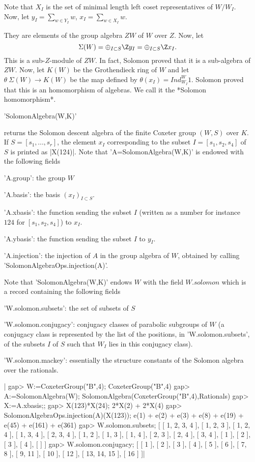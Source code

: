 Note  that $X_I$ is the set of minimal length left coset representatives of
$W/W_I$. Now, let $y_I=\sum_{w \in Y_I} w$, $x_I=\sum_{w \in X_I} w$.

They  are elements  of the  group algebra  $ZW$ of  $W$ over  $Z$. Now, let
$$\Sigma(W)  =  \oplus_{I  \subset  S}  \Z  y_I = \oplus_{I \subset S} \Z
x_I.$$ This is a sub-$Z$-module of $ZW$. In fact, Solomon proved that it is
a  sub-algebra of $ZW$. Now, let $K(W)$ be the Grothendieck ring of $W$ and
let  $\theta\:\Sigma(W)\to  K(W)$  be  the  map  defined  by $\theta(x_I) =
Ind_{W_I}^W 1$. Solomon proved that this is an homomorphism of algebras. We
call it the *Solomon homomorphism*.

'SolomonAlgebra(W,K)'

returns  the Solomon  descent algebra  of the  finite Coxeter group $(W,S)$
over  $K$.  If  $S=[s_1,...,s_r]$,  the  element $x_I$ corresponding to the
subset   $I=[s_1,s_2,s_4]$  of  $S$  is  printed  as  |X(124)|.  Note  that
'A\:=SolomonAlgebra(W,K)' is endowed with the following fields\:

'A.group': the group $W$

'A.basis': the basis $(x_I)_{I \subset S}$.

'A.xbasis':  the function sending the subset $I$ (written as a number\: for
instance $124$ for $[s_1,s_2,s_4]$) to $x_I$.

'A.ybasis': the function sending the subset $I$ to $y_I$.

'A.injection':  the injection of $A$ in the group algebra of $W$, obtained
by calling 'SolomonAlgebraOps.injection(A)'.

Note that 'SolomonAlgebra(W,K)' endows $W$ with the field $W.solomon$ which
is a record containing the following fields\:

'W.solomon.subsets': the set of subsets of $S$

'W.solomon.conjugacy':  conjugacy classes  of parabolic  subgroups of $W$ (a
conjugacy   class  is  represented  by  the   list  of  the  positions,  in
'W.solomon.subsets', of the subsets $I$ of $S$ such that $W_I$ lies in this
conjugacy class).

'W.solomon.mackey':  essentially  the  structure  constants  of  the Solomon
algebra over the rationals.

|    gap> W:=CoxeterGroup("B",4);
    CoxeterGroup("B",4)
    gap> A:=SolomonAlgebra(W);
    SolomonAlgebra(CoxeterGroup("B",4),Rationals)
    gap> X:=A.xbasis;;
    gap> X(123)*X(24);
    2*X(2) + 2*X(4)
    gap> SolomonAlgebraOps.injection(A)(X(123));
    e(1) + e(2) + e(3) + e(8) + e(19) + e(45) + e(161) + e(361)
    gap> W.solomon.subsets;
    [ [ 1, 2, 3, 4 ], [ 1, 2, 3 ], [ 1, 2, 4 ], [ 1, 3, 4 ], [ 2, 3, 4 ],
      [ 1, 2 ], [ 1, 3 ], [ 1, 4 ], [ 2, 3 ], [ 2, 4 ], [ 3, 4 ], [ 1 ], [ 2 ],
      [ 3 ], [ 4 ], [  ] ]
    gap> W.solomon.conjugacy;
    [ [ 1 ], [ 2 ], [ 3 ], [ 4 ], [ 5 ], [ 6 ], [ 7, 8 ], [ 9, 11 ], [ 10 ],
      [ 12 ], [ 13, 14, 15 ], [ 16 ] ]|

